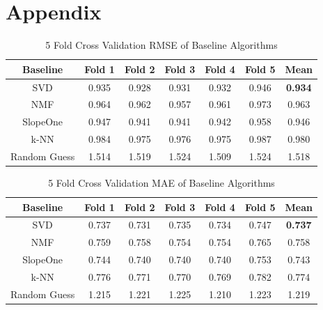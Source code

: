 \documentclass{article}
\begin{document}
\newpage

\section{Appendix}

\begin{table}[H]
    \centering
        \begin{tabular}{|c c c c c c c|} 
         \hline
         Baseline & Fold 1 & Fold 2 & Fold 3 & Fold 4 & Fold 5 & Mean \\ [0.5ex] 
         \hline\hline
         SVD & 0.935 & 0.928 & 0.931 & 0.932 & 0.946 & \bfseries 0.934 \\ 
         \hline
         NMF & 0.964 & 0.962 & 0.957 & 0.961 & 0.973 & 0.963 \\
         \hline
         SlopeOne & 0.947 & 0.941 & 0.941 & 0.942 & 0.958 & 0.946 \\
         \hline
         k-NN & 0.984 & 0.975 & 0.976 & 0.975 & 0.987 & 0.980 \\
         \hline
         Random Guess & 1.514 & 1.519 & 1.524 & 1.509 & 1.524 & 1.518 \\ [1ex] 
         \hline
        \end{tabular}
    \caption{5 Fold Cross Validation RMSE of Baseline Algorithms}
    \label{tab:rmse_results}
\end{table}

\begin{table}[H]
    \centering
        \begin{tabular}{|c c c c c c c|} 
         \hline
         Baseline & Fold 1 & Fold 2 & Fold 3 & Fold 4 & Fold 5 & Mean \\ [0.5ex] 
         \hline\hline
         SVD & 0.737 & 0.731 & 0.735 & 0.734 & 0.747 & \bfseries 0.737 \\ 
         \hline
         NMF & 0.759 & 0.758 & 0.754 & 0.754 & 0.765 & 0.758 \\
         \hline
         SlopeOne & 0.744 & 0.740 & 0.740 & 0.740 & 0.753 & 0.743 \\
         \hline
         k-NN & 0.776 & 0.771 & 0.770 & 0.769 & 0.782 & 0.774 \\
         \hline
         Random Guess & 1.215 & 1.221 & 1.225 & 1.210 & 1.223 & 1.219 \\ [1ex] 
         \hline
        \end{tabular}
    \caption{5 Fold Cross Validation MAE of Baseline Algorithms}
    \label{tab:mae_results}
\end{table}
\end{document}
